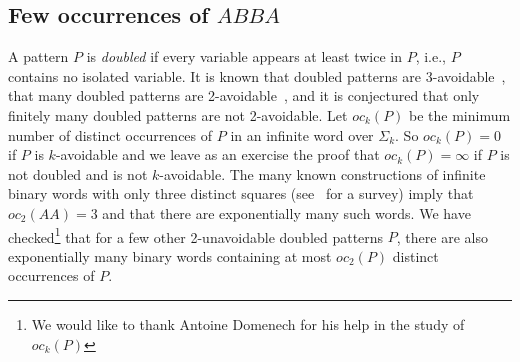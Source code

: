 \documentclass{article}
\theoremstyle{plain}
\theoremstyle{definition}
\theoremstyle{remark}
\begin{document}
\subsection{Few occurrences of $ABBA$}\label{ssec:abba}

A pattern $P$ is \emph{doubled} if every variable appears at least twice in $P$, i.e., $P$ contains no isolated variable.
It is known that doubled patterns are 3-avoidable~\cite{O16}, that many doubled patterns are 2-avoidable~\cite{DO2023},
and it is conjectured that only finitely many doubled patterns are not 2-avoidable.
Let $oc_k(P)$ be the minimum number of distinct occurrences of $P$ in an infinite word over $\Sigma_k$.
So $oc_k(P)=0$ if $P$ is $k$-avoidable and we leave as an exercise the proof that $oc_k(P)=\infty$
if $P$ is not doubled and is not $k$-avoidable.
The many known constructions of infinite binary words with only three distinct squares (see~\cite{GS2021} for a survey)
imply that $oc_2(AA)=3$ and that there are exponentially many such words.
We have checked\footnote{We would like to thank Antoine Domenech for his help in the study of $oc_k(P)$}
that for a few other 2-unavoidable doubled patterns $P$,
there are also exponentially many binary words containing at most $oc_2(P)$ distinct occurrences of $P$.
\end{document}
